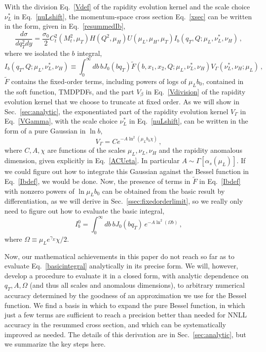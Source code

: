 \documentclass[a4,letterpaper,11pt]{article}
\newcommand{\be}{\begin{equation}}
\newcommand{\ee}{\end{equation}}
\newcommand{\as}{\alpha_s}
\newcommand{\wt}{\widetilde}
\newcommand{\eq}[1]{Eq.~\eqref{#1}}
\renewcommand{\sec}[1]{Sec.~\ref{sec:#1}}
\newcommand{\ssec}[1]{Sec.~\ref{ssec:#1}}
\begin{document}
With the division \eq{Vdef} of the rapidity evolution kernel and the scale choice $\nu_L^*$ in \eq{nuLshift}, the momentum-space cross section \eq{xsec} can be written in the form, given in \eq{resummedIb}, 
\be
\label{qTcs}
\frac{d\sigma}{dq_T^2 dy} = \frac{\sigma_0}{2} C_t^2(M_t^2, \mu_T) H(Q^2,\mu_H) U(\mu_L,\mu_H, \mu_T) I_b(q_T,Q;\mu_L,\nu_L^*,\nu_H)\,,
\ee
where we isolated the $b$ integral,
\be
\label{Ibintro}
I_b(q_T,Q;\mu_L,\nu_L^*,\nu_H) \equiv \int_0^\infty db\,b J_0(bq_T) \wt F(b,x_1,x_2,Q;\mu_L,\nu_L^*,\nu_H) V_\Gamma(\nu_L^*,\nu_H;\mu_L)\,,
\ee
$\wt F$ contains the fixed-order terms, including powers of logs of $\mu_L b_0$, contained in the soft function, TMDPDFs, and the part $V_\beta$ in \eq{Vdivision} of the rapidity evolution kernel that we choose to truncate at fixed order. As we will show in \sec{analytic}, the exponentiated part of the rapidity evolution kernel $V_\Gamma$ in \eq{VGamma}, with the scale choice $\nu_L^*$ in \eq{nuLshift}, can be written in the form of a pure Gaussian in $\ln b$,
\be
\label{VGauss}
V_\Gamma = C e^{-A \ln^2(\mu_L b_0 \chi)}\,,
\ee
where $C,A,\chi$ are functions of the scales $\mu_L,\nu_L,\nu_H$ and the rapidity anomalous dimension, given explicitly in \eq{ACUeta}. In particular $A\sim \Gamma[\as(\mu_L)]$. If we could figure out how to integrate this Gaussian against the Bessel function in \eq{Ibdef}, we would be done. Now, the presence of terms in $\wt F$ in \eq{Ibdef} with nonzero powers of $\ln \mu_L b_0$ can be obtained from the basic result by differentiation, as we will derive in \ssec{fixedorderlimit}, so we really only need to figure out how to evaluate the basic integral,
\be
\label{basicintegral}
I_b^0= \int_0^\infty db\, b J_0(b q_T)\, e^{-A\ln^2(\Omega b)}\,,
\ee
where $\Omega \equiv \mu_L e^{\gamma_E}\chi/2$.

Now, our mathematical achievements in this paper do not reach so far as to evaluate \eq{basicintegral} analytically in its precise form. We will, however, develop a procedure to evaluate it in a closed form, with analytic dependence on $q_T,A,\Omega$ (and thus all scales and anomalous dimensions), to arbitrary numerical accuracy determined by the goodness of an approximation we use for the Bessel function. We find a basis in which to expand the pure Bessel function, in which just a few terms are sufficient to reach a precision better than needed for NNLL accuracy in the resummed cross section, and which can be systematically improved as needed. The details of this derivation are in \sec{analytic}, but we summarize the key steps here.
\end{document}
